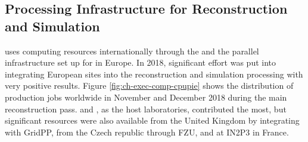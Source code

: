 \subsection{Processing Infrastructure for Reconstruction and Simulation}
\label{ch-comp-processing}
 uses computing resources internationally through the  and the parallel infrastructure set up for  in Europe.  In 2018, significant effort was put into integrating European sites into the  reconstruction and simulation processing with very positive results.  
Figure \ref{fig:ch-exec-comp-cpupie} shows the distribution of production jobs worldwide in November and December 2018 during the main reconstruction pass.   and , as the host laboratories, contributed the most, but significant resources were also available from the United Kingdom by integrating with GridPP, from the Czech republic through FZU, and at IN2P3 in France. 


